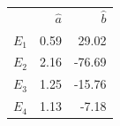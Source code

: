 \begin{table}[http]
 \centering
\begin{tabular}{lrr}
{} &    $\hat{a}$ &      $\hat{b}$ \\
$E_1$ & 0.59 &  29.02 \\
 $E_2$ & 2.16 & -76.69 \\
$E_3$ & 1.25 & -15.76 \\
$E_4$ & 1.13 &  -7.18 \\
\end{tabular}
\end{table}



